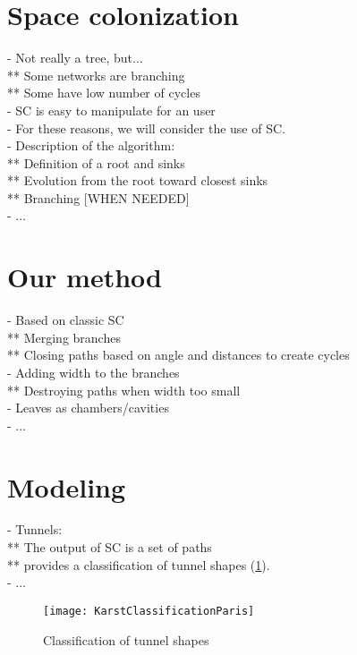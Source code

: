 \section{Space colonization}
\label{sec:karsts_space-colonization}
- Not really a tree, but... \\
** Some networks are branching \\
** Some have low number of cycles \\
- SC is easy to manipulate for an user \\
- For these reasons, we will consider the use of SC. \\
- Description of the algorithm: \\
** Definition of a root and sinks \\
** Evolution from the root toward closest sinks \\
** Branching [WHEN NEEDED] \\
- ...

\section{Our method}
\label{sec:karsts_our-method}
- Based on classic SC \\
** Merging branches \\
** Closing paths based on angle and distances to create cycles \\
- Adding width to the branches \\
** Destroying paths when width too small \\
- Leaves as chambers/cavities \\
- ... 

\section{Modeling}
\label{sec:karsts_modeling}
- Tunnels: \\
** The output of SC is a set of paths \\
** \cite{Paris2021} provides a classification of tunnel shapes (\cref{fig:karsts_tunnel-classif}). \\
- ...

\begin{figure}
    \texttt{[image: KarstClassificationParis]}
    \caption{Classification of tunnel shapes}
    \label{fig:karsts_tunnel-classif}
\end{figure}

